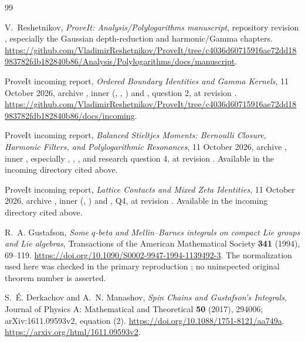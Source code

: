 \clearpage
\begin{thebibliography}{99}
\small\raggedright
{}

V.~Reshetnikov, \emph{ProveIt: Analysis/Polylogarithms manuscript},
repository revision \pin, especially the Gaussian depth-reduction
and harmonic/Gamma chapters.
\url{https://github.com/VladimirReshetnikov/ProveIt/tree/c4036d60715916ae72dd18983782fdb182840b86/Analysis/Polylogarithms/docs/manuscript}.

ProveIt incoming report,
\emph{Ordered Boundary Identities and Gamma Kernels},
11 October 2026,
archive ,
inner 
(, , )
and , question 2,
at revision \pin.
\url{https://github.com/VladimirReshetnikov/ProveIt/tree/c4036d60715916ae72dd18983782fdb182840b86/docs/incoming}.

ProveIt incoming report,
\emph{Balanced Stieltjes Moments: Bernoulli Closure, Harmonic Filters,
and Polylogarithmic Resonances},
11 October 2026,
archive ,
inner ,
especially , ,
, and research question 4,
at revision \pin.
Available in the incoming directory cited above.

ProveIt incoming report,
\emph{Lattice Contacts and Mixed Zeta Identities},
11 October 2026,
archive
,
inner 
(, )
and , Q4,
at revision \pin.
Available in the incoming directory cited above.

R.~A. Gustafson,
\emph{Some $q$-beta and Mellin--Barnes integrals on compact Lie groups
and Lie algebras},
Transactions of the American Mathematical Society \textbf{341}
(1994), 69--119.
\url{https://doi.org/10.1090/S0002-9947-1994-1139492-3}.
The normalization used here was checked in the primary reproduction
\cite[equation (2)]{derkachov2017}; no uninspected original theorem
number is asserted.

S.~\'E. Derkachov and A.~N. Manashov,
\emph{Spin Chains and Gustafson's Integrals},
Journal of Physics A: Mathematical and Theoretical \textbf{50}
(2017), 294006; arXiv:1611.09593v2, equation (2).
\url{https://doi.org/10.1088/1751-8121/aa749a}.
\url{https://arxiv.org/html/1611.09593v2}.


\end{thebibliography}
